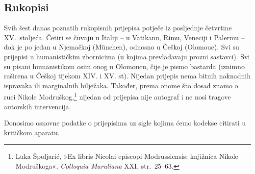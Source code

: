 \documentclass[a5paper,twoside]{article}
\begin{document}
\subsection{Rukopisi}

Svih šest danas poznatih rukopisnih prijepisa potječe iz posljednje četvrtine XV.~stoljeća. Četiri se čuvaju u Italiji – u Vatikanu, Rimu, Veneciji i Palermu – dok je po jedan u Njemačkoj (München), odnosno u Češkoj (Olomouc). Svi su prijepisi u humanističkim zbornicima (u kojima prevladavaju prozni sastavci). Svi su pisani humanistikom osim onog u Olomoucu, čije je pismo bastarda (iznimno raširena u Češkoj tijekom XIV. i XV. st). Nijedan prijepis nema bitnih naknadnih ispravaka ili marginalnih bilježaka. Također, prema onome što dosad znamo o ruci Nikole Modruškog,\footnote{Luka Špoljarić, »Ex libris Nicolai episcopi Modrussiensis: knjižnica Nikole Modruškoga«, \textit{Colloquia Maruliana} XXI, str.~25–63.} nijedan od prijepisa nije autograf i ne nosi tragove autorskih intervencija.

Donosimo osnovne podatke o prijepisima uz sigle kojima ćemo kodekse citirati u kritičkom aparatu.
\end{document}
